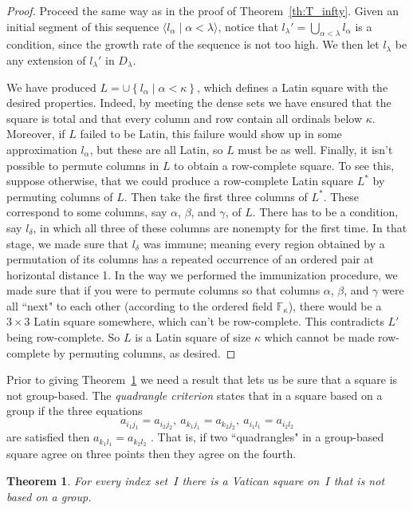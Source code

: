 \documentclass[12pt,a4paper]{article}
\newtheorem{thm}{Theorem}[section]
\newcommand{\F}{\mathbb{F}}
\newcommand{\st}{\; | \;}
\newcommand{\set}[2]{\left\{#1\st #2 \right\}}
\newcommand{\seq}[2]{\langle #1 \st #2 \rangle}
\begin{document}
\begin{proof}
Proceed the same way as in the proof of Theorem~\ref{th:T_infty}. Given an initial segment of this sequence $\seq{l_\alpha}{\alpha<\lambda}$, notice that $l_\lambda'=\bigcup_{\alpha<\lambda}l_\alpha$ is a condition, since the growth rate of the sequence is not too high. We then let $l_\lambda$ be any extension of $l_\lambda'$ in $D_\lambda$.

We have produced $L=\cup \set{l_\alpha}{\alpha<\kappa}$, which defines a Latin square with the desired properties. Indeed, by meeting the dense sets we have ensured that the square is total and that every column and row contain all ordinals below $\kappa$. Moreover, if $L$ failed to be Latin, this failure would show up in some approximation $l_\alpha$, but these are all Latin, so $L$ must be as well. Finally, it isn't possible to permute columns in $L$ to obtain a row-complete square. To see this, suppose otherwise, that we could produce a row-complete Latin square $L^*$ by permuting columns of $L$. Then take the first three columns of $L^*$. These correspond to some columns, say $\alpha$, $\beta$, and $\gamma$, of $L$. There has to be a condition, say $l_\delta$, in which all three of these columns are nonempty for the first time. In that stage, we made sure that $l_\delta$ was immune; meaning every region obtained by a permutation of its columns has a repeated occurrence of an ordered pair at horizontal distance 1. In the way we performed the immunization procedure, we made sure that if you were to permute columns so that columns $\alpha$, $\beta$, and $\gamma$ were all ``next" to each other (according to the ordered field $\F_\kappa$), there would be a $3\times3$ Latin square somewhere, which can't be row-complete. This contradicts $L'$ being row-complete. So $L$ is a Latin square of size $\kappa$ which cannot be made row-complete by permuting columns, as desired.
\end{proof}



Prior to giving Theorem~\ref{th:infvat} we need a result that lets us be sure that a square is not group-based.  The {\em quadrangle criterion} states that in a square based on a group if the three equations
$$a_{i_1j_1} = a_{i_2j_2}, \ a_{k_1j_1} = a_{k_2j_2}, \ a_{i_1l_1} = a_{i_2l_2}$$
are satisfied then $a_{k_1l_1} = a_{k_2l_2}$ \cite[Theorem~1.2.1]{DK15}.  That is, if two ``quadrangles" in a group-based square agree on three points then they agree on the fourth.


\begin{thm}\label{th:infvat}
For every index set~$I$  
there is a Vatican square on~$I$ that is not based on a  group.
\end{thm}
\end{document}
